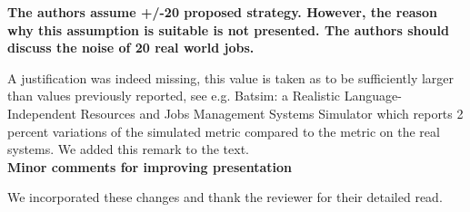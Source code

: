 \documentclass[]{article}
\begin{document}
\textbf{The authors assume +/-20%
proposed strategy. However, the reason why this assumption is suitable is not
presented. The authors should discuss the noise of 20%
real world jobs.}

A justification was indeed missing, this value is taken as to be sufficiently
larger than values previously reported, see e.g. Batsim: a Realistic
Language-Independent Resources and Jobs Management Systems Simulator which
reports 2 percent variations of the simulated metric compared to the metric on
the real systems. We added this remark to the text.\\

\textbf{Minor comments for improving presentation}

We incorporated these changes and thank the reviewer for their detailed read.\\



\end{document}
